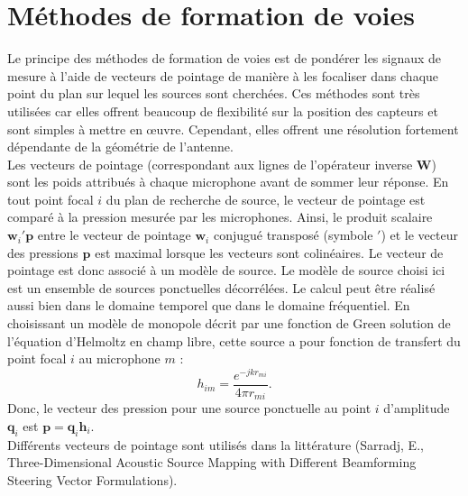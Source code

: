 \section{Méthodes de formation de voies}

Le principe des méthodes de formation de voies est de pondérer les signaux de mesure à l'aide de vecteurs de pointage de manière à les focaliser dans chaque point du plan sur lequel les sources sont cherchées.
Ces méthodes sont très utilisées car elles offrent beaucoup de flexibilité sur la position des capteurs et sont simples à mettre en œuvre. Cependant, elles offrent une résolution fortement dépendante de la géométrie de l'antenne.\\
Les vecteurs de pointage (correspondant aux lignes de l'opérateur inverse $\bm{W}$) sont les poids attribués à chaque microphone avant de sommer leur réponse.  En tout point focal $i$ du plan de recherche de source, le vecteur de pointage est comparé à la pression mesurée par les microphones. Ainsi, le produit scalaire $\bm{w}_i'\bm{p}$ entre le vecteur de pointage $\bm{w}_i$ conjugué transposé (symbole $'$) et le vecteur des pressions $\bm{p}$ est maximal lorsque les vecteurs sont colinéaires. Le vecteur de pointage est donc associé à un modèle de source. Le modèle de source choisi ici est un ensemble de sources ponctuelles décorrélées. Le calcul peut être réalisé aussi bien dans le domaine temporel que dans le domaine fréquentiel. En choisissant un modèle de monopole décrit par une fonction de Green solution de l'équation d'Helmoltz en champ libre, cette source a pour fonction de transfert du point focal $i$ au microphone $m$ : 
\begin{equation}
	h_{im}=\frac{e^{-jkr_{mi}}}{4\pi r_{mi}}.
\end{equation}
Donc, le vecteur des pression pour une source ponctuelle au point $i$ d'amplitude $\bm{q}_i$ est $\bm{p}=\bm{q}_i\bm{h}_i$.\\
Différents vecteurs de pointage sont utilisés dans la littérature (Sarradj, E., Three-Dimensional Acoustic Source Mapping with Different Beamforming Steering Vector Formulations).


